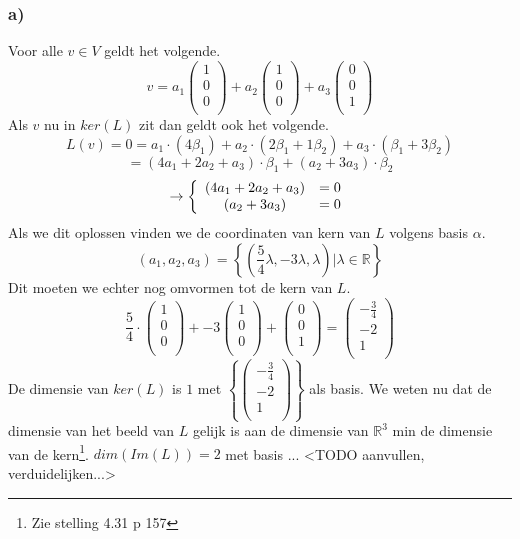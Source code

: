 \documentclass[lineaire_algebra_oplossingen.tex]{subfiles}
\begin{document}
\subsubsection*{a)}
Voor alle $v \in V$ geldt het volgende.
\[
v
=
a_1
\begin{pmatrix}
1\\0\\0\\
\end{pmatrix}
+
a_2
\begin{pmatrix}
1\\0\\0\\
\end{pmatrix}
+
a_3
\begin{pmatrix}
0\\0\\1\\
\end{pmatrix}
\]
Als $v$ nu in $ker(L)$ zit dan geldt ook het volgende.
\[
L(v) = 0 = a_1 \cdot (4\beta_1) + a_2 \cdot (2 \beta_1 + 1\beta_2) + a_3 \cdot (\beta_1 + 3\beta_2)
\]
\[
= (4a_1+2a_2+a_3)\cdot\beta_1 + (a_2+3a_3)\cdot\beta_2
\]
\[
\rightarrow
\left\lbrace
\begin{array}{c c}
(4a_1+2a_2+a_3) &= 0\\
(a_2+3a_3) &= 0\\
\end{array}
\right.
\]
Als we dit oplossen vinden we de coordinaten van kern van $L$ volgens basis $\alpha$.
\[
(a_1,a_2,a_3) = 
\left\{(\frac{5}{4}\lambda,-3\lambda,\lambda) | \lambda \in \mathbb{R}\right\}
\]
Dit moeten we echter nog omvormen tot de kern van $L$.
\[
\frac{5}{4}\cdot
\begin{pmatrix}
1\\0\\0\\
\end{pmatrix}
+
-3
\begin{pmatrix}
1\\0\\0\\
\end{pmatrix}
+
\begin{pmatrix}
0\\0\\1\\
\end{pmatrix}
=
\begin{pmatrix}
-\frac{3}{4}\\-2\\1\\
\end{pmatrix}
\]
De dimensie van $ker(L)$ is $1$ met $\left\{\begin{pmatrix}-\frac{3}{4}\\-2\\1\\\end{pmatrix}\right\}$ als basis.
We weten nu dat de dimensie van het beeld van $L$ gelijk is aan de dimensie van $\mathbb{R}^3$ min de dimensie van de kern\footnote{Zie stelling 4.31 p 157}. $dim(Im(L))= 2$ met basis ... <TODO aanvullen, verduidelijken...>
\end{document}
